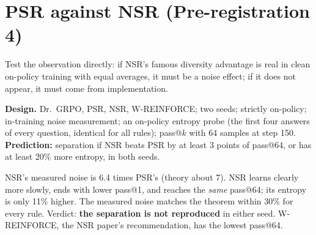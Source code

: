\documentclass[11pt]{article}
\begin{document}
\section{PSR against NSR (Pre-registration 4)}\label{sec:p4}

\begin{why}
Test the observation directly: if NSR's famous diversity advantage is real in clean on-policy training with equal averages, it must be a noise effect; if it does not appear, it must come from implementation.
\end{why}
\textbf{Design.} Dr.\ GRPO, PSR, NSR, W-REINFORCE; two seeds; strictly on-policy; in-training noise measurement; an on-policy entropy probe (the first four answers of every question, identical for all rules); pass@$k$ with 64 samples at step 150. \textbf{Prediction:} separation if NSR beats PSR by at least 3 points of pass@64, or has at least 20\% more entropy, in both seeds.

\begin{table}[H]
\centering\small
{}
\caption{Untrained model: pass@1 13.8, pass@64 79.9.}
\end{table}

\begin{found}
NSR's measured noise is 6.4 times PSR's (theory about 7). NSR learns clearly more slowly, ends with lower pass@1, and reaches the \emph{same} pass@64; its entropy is only 11\% higher. The measured noise matches the theorem within 30\% for every rule. Verdict: \textbf{the separation is not reproduced} in either seed. W-REINFORCE, the NSR paper's recommendation, has the lowest pass@64.
\end{found}
\end{document}
